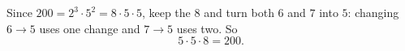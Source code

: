 Since $200=2^3\cdot5^2=8\cdot5\cdot5$, keep the $8$ and turn both $6$ and $7$ into $5$: changing $6\to5$ uses one change and $7\to5$ uses two. So
\[\boxed{5\cdot5\cdot8=200}.\]

